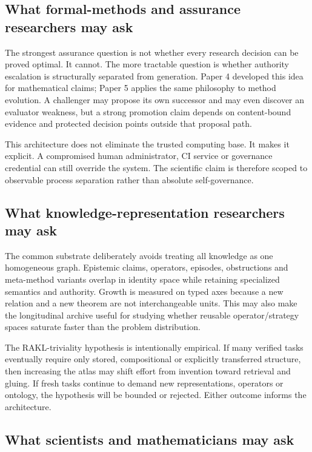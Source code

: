\subsection{What formal-methods and assurance researchers may ask}

The strongest assurance question is not whether every research decision can be proved optimal. It cannot. The more tractable question is whether authority escalation is structurally separated from generation. Paper 4 developed this idea for mathematical claims; Paper 5 applies the same philosophy to method evolution. A challenger may propose its own successor and may even discover an evaluator weakness, but a strong promotion claim depends on content-bound evidence and protected decision points outside that proposal path.

This architecture does not eliminate the trusted computing base. It makes it explicit. A compromised human administrator, CI service or governance credential can still override the system. The scientific claim is therefore scoped to observable process separation rather than absolute self-governance.

\subsection{What knowledge-representation researchers may ask}

The common substrate deliberately avoids treating all knowledge as one homogeneous graph. Epistemic claims, operators, episodes, obstructions and meta-method variants overlap in identity space while retaining specialized semantics and authority. Growth is measured on typed axes because a new relation and a new theorem are not interchangeable units. This may also make the longitudinal archive useful for studying whether reusable operator/strategy spaces saturate faster than the problem distribution.

The RAKL-triviality hypothesis is intentionally empirical. If many verified tasks eventually require only stored, compositional or explicitly transferred structure, then increasing the atlas may shift effort from invention toward retrieval and gluing. If fresh tasks continue to demand new representations, operators or ontology, the hypothesis will be bounded or rejected. Either outcome informs the architecture.

\subsection{What scientists and mathematicians may ask}

